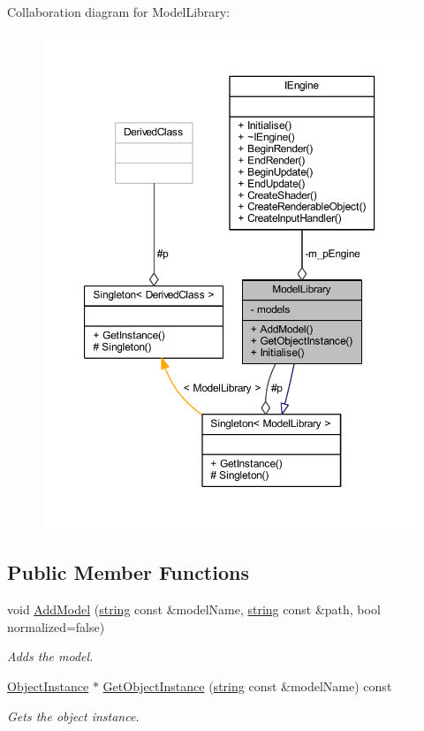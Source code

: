Collaboration diagram for Model\+Library\+:\nopagebreak
\begin{figure}[H]
\begin{center}
\leavevmode
\includegraphics[width=350pt]{class_model_library__coll__graph}
\end{center}
\end{figure}
\subsection*{Public Member Functions}
\begin{DoxyCompactItemize}
\item 
void \hyperlink{class_model_library_a580264d3ee6f553c916f04cecf2de660}{Add\+Model} (\hyperlink{_types_8h_ad453f9f71ce1f9153fb748d6bb25e454}{string} const \&model\+Name, \hyperlink{_types_8h_ad453f9f71ce1f9153fb748d6bb25e454}{string} const \&path, bool normalized=false)
\begin{DoxyCompactList}\small\item\em Adds the model. \end{DoxyCompactList}\item 
\hyperlink{class_object_instance}{Object\+Instance} $\ast$ \hyperlink{class_model_library_a1e9987808a135340d5b321f5b79c573f}{Get\+Object\+Instance} (\hyperlink{_types_8h_ad453f9f71ce1f9153fb748d6bb25e454}{string} const \&model\+Name) const 
\begin{DoxyCompactList}\small\item\em Gets the object instance. \end{DoxyCompactList}\end{DoxyCompactItemize}
